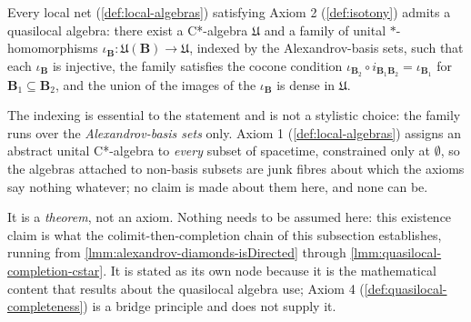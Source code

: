 \begin{theorem}
    \label{thrm:quasilocal-algebra-exists}
    \leanok
    Every local net (\ref{def:local-algebras}) satisfying Axiom 2 (\ref{def:isotony}) admits a quasilocal algebra: there exist a C*-algebra $\mathfrak{U}$ and a family of unital $*$-homomorphisms $\iota_{\mathbf{B}} : \mathfrak{U}(\mathbf{B}) \to \mathfrak{U}$, indexed by the Alexandrov-basis sets, such that each $\iota_{\mathbf{B}}$ is injective, the family satisfies the cocone condition $\iota_{\mathbf{B}_2} \circ i_{\mathbf{B}_1 \mathbf{B}_2} = \iota_{\mathbf{B}_1}$ for $\mathbf{B}_1 \subseteq \mathbf{B}_2$, and the union of the images of the $\iota_{\mathbf{B}}$ is dense in $\mathfrak{U}$.

    The indexing is essential to the statement and is not a stylistic choice: the family runs over the \emph{Alexandrov-basis sets} only. Axiom 1 (\ref{def:local-algebras}) assigns an abstract unital C*-algebra to \emph{every} subset of spacetime, constrained only at $\emptyset$, so the algebras attached to non-basis subsets are junk fibres about which the axioms say nothing whatever; no claim is made about them here, and none can be.

    It is a \emph{theorem}, not an axiom. Nothing needs to be assumed here: this existence claim is what the colimit-then-completion chain of this subsection establishes, running from \ref{lmm:alexandrov-diamonds-isDirected} through \ref{lmm:quasilocal-completion-cstar}. It is stated as its own node because it is the mathematical content that results about the quasilocal algebra use; Axiom 4 (\ref{def:quasilocal-completeness}) is a bridge principle and does not supply it.


\end{theorem}
